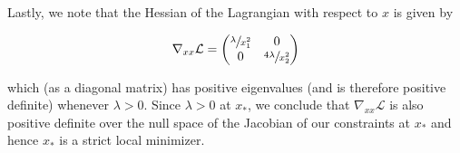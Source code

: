 \begin{solution}
    Lastly, we note that the Hessian of the Lagrangian with respect to $x$ is given by

    $$
    \nabla_{xx} \mathcal{L} = \begin{pmatrix*}
        \sfrac{\lambda}{x_1^2} & 0 \\
        0                      & \sfrac{4 \lambda}{x_2^2}
    \end{pmatrix*}
    $$

    which (as a diagonal matrix) has positive eigenvalues (and is therefore positive definite) whenever $\lambda > 0$. 
    Since $\lambda > 0$ at $x_*$, we conclude that $\nabla_{xx} \mathcal{L}$ is also positive definite over the null 
    space of the Jacobian of our constraints at $x_*$ and hence $x_*$ is a strict local minimizer.
    \ \\
\end{solution}